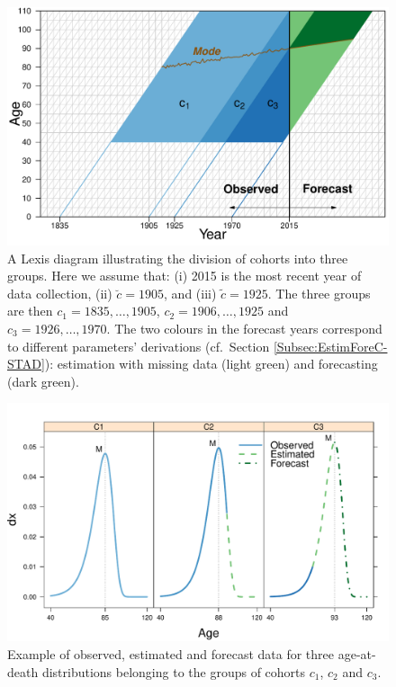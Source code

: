 \documentclass[11pt, a4paper]{article}
\begin{document}
\begin{figure}[t]
	\begin{center}
		\includegraphics[scale=0.7]{./Figures/F2.pdf} 
		\caption{A Lexis diagram illustrating the division of cohorts into three groups. Here we assume that: (i) 2015 is the most recent year of data collection, (ii) $\breve{c}=1905$, and (iii) $\tilde{c}=1925$. The three groups are then $c_1=1835, \ldots, 1905$, $c_2=1906, \ldots, 1925$ and $c_3=1926, \ldots, 1970$. The two colours in the forecast years correspond to different parameters' derivations (cf.~Section \ref{Subsec:EstimForeC-STAD}): estimation with missing data (light green) and forecasting (dark green). \label{Fig:Lexis}}    
	\end{center}
\end{figure}

\begin{figure}[t]
	\begin{center}
		\includegraphics[scale=0.7]{./Figures/F3.pdf} 
		\caption{Example of observed, estimated and forecast data for three age-at-death distributions belonging to the groups of cohorts $c_1$, $c_2$ and $c_3$.\label{Fig:DxExample}}    
	\end{center}
\end{figure}
\end{document}
